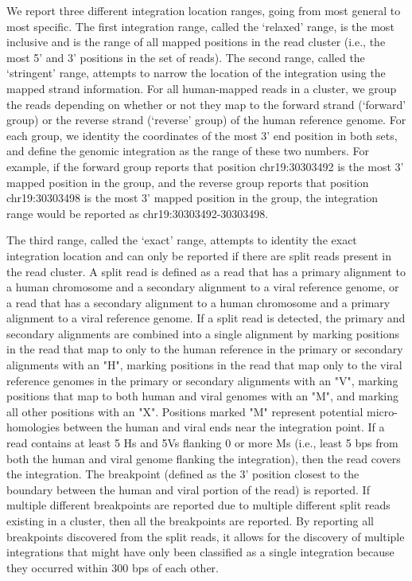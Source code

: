 \documentclass{bmcart}
\begin{document}
We report three different integration location ranges, going from most general to most specific.  The first integration range, called the `relaxed' range, is the most inclusive and is the range of all mapped positions in the read cluster (i.e., the most 5' and 3' positions in the set of reads).  The second range, called the `stringent' range, attempts to narrow the location of the integration using the mapped strand information.  For all human-mapped reads in a cluster, we group the reads depending on whether or not they map to the forward strand (`forward' group) or the reverse strand (`reverse' group) of the human reference genome.  For each group, we identity the coordinates of the most 3' end position in both sets, and define the genomic integration as the range of these two numbers.  For example, if the forward group reports that position chr19:30303492 is the most 3' mapped position in the group, and the reverse group reports that position chr19:30303498 is the most 3' mapped position in the group, the integration range would be reported as chr19:30303492-30303498.

The third range, called the `exact' range, attempts to identity the exact integration location and can only be reported if there are split reads present in the read cluster.  A split read is defined as a read that has a primary alignment to a human chromosome and a secondary alignment to a viral reference genome, or a read that has a secondary alignment to a human chromosome and a primary alignment to a viral reference genome.  If a split read is detected, the primary and secondary alignments are combined into a single alignment by marking positions in the read that map to only to the human reference in the primary or secondary alignments with an "H", marking positions in the read  that map only to the viral reference genomes in the primary or secondary alignments with an "V", marking positions that map to both human and viral genomes with an "M", and marking all other positions with an "X".  Positions marked "M" represent potential micro-homologies between the human and viral ends near the integration point.  If a read contains at least 5 Hs and 5Vs flanking 0 or more Ms (i.e., least 5 bps from both the human and viral genome flanking the integration), then the read covers the integration.  The breakpoint (defined as the 3' position closest to the boundary between the human and viral portion of the read) is reported.  If multiple different breakpoints are reported due to multiple different split reads existing in a cluster, then all the breakpoints are reported.  By reporting all breakpoints discovered from the split reads, it allows for the discovery of multiple integrations that might have only been classified as a single integration because they occurred within 300 bps of each other.
\end{document}
